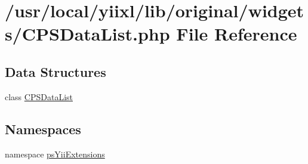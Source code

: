 \hypertarget{CPSDataList_8php}{
\section{/usr/local/yiixl/lib/original/widgets/CPSDataList.php File Reference}
\label{CPSDataList_8php}
}
\subsection*{Data Structures}
\begin{DoxyCompactItemize}
\item 
class \hyperlink{classCPSDataList}{CPSDataList}
\end{DoxyCompactItemize}
\subsection*{Namespaces}
\begin{DoxyCompactItemize}
\item 
namespace \hyperlink{namespacepsYiiExtensions}{psYiiExtensions}
\end{DoxyCompactItemize}

